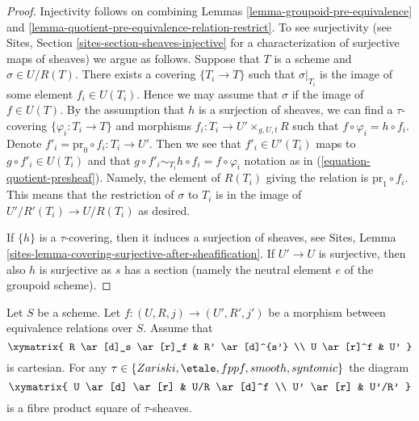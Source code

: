 \begin{proof}
Injectivity follows on combining
Lemmas \ref{lemma-groupoid-pre-equivalence} and
\ref{lemma-quotient-pre-equivalence-relation-restrict}.
To see surjectivity (see
Sites, Section \ref{sites-section-sheaves-injective}
for a characterization of surjective maps of sheaves) we argue as follows.
Suppose that $T$ is a scheme and $\sigma \in U/R(T)$.
There exists a covering $\{T_i \to T\}$ such that $\sigma|_{T_i}$
is the image of some element $f_i \in U(T_i)$. Hence we
may assume that $\sigma$ if the image of $f \in U(T)$.
By the assumption that $h$ is a surjection of sheaves, we
can find a $\tau$-covering $\{\varphi_i : T_i \to T\}$ and morphisms
$f_i : T_i \to U' \times_{g, U, t} R$ such that
$f \circ \varphi_i = h \circ f_i$. Denote
$f'_i = \text{pr}_0 \circ f_i : T_i \to U'$. Then we see that
$f'_i \in U'(T_i)$ maps to $g \circ f'_i \in U(T_i)$ and
that $g \circ f'_i \sim_{T_i} h \circ f_i = f \circ \varphi_i$
notation as in (\ref{equation-quotient-presheaf}). Namely, the
element of $R(T_i)$ giving the relation is $\text{pr}_1 \circ f_i$.
This means that the restriction
of $\sigma$ to $T_i$ is in the image of $U'/R'(T_i) \to U/R(T_i)$
as desired.

\medskip\noindent
If $\{h\}$ is a $\tau$-covering, then it induces a surjection of sheaves, see
Sites, Lemma \ref{sites-lemma-covering-surjective-after-sheafification}.
If $U' \to U$ is surjective, then also $h$ is surjective as $s$ has a section
(namely the neutral element $e$ of the groupoid scheme).
\end{proof}

\begin{lemma}
\label{lemma-criterion-fibre-product}
Let $S$ be a scheme. Let $f : (U, R, j) \to (U', R', j')$ be a morphism
between equivalence relations over $S$. Assume that
$$
\xymatrix{
R \ar[d]_s \ar[r]_f & R' \ar[d]^{s'} \\
U \ar[r]^f & U'
}
$$
is cartesian. For any
$\tau \in  \{Zariski, \etale, fppf, smooth, syntomic\}$
the diagram
$$
\xymatrix{
U \ar[d] \ar[r] & U/R \ar[d]^f \\
U' \ar[r] & U'/R'
}
$$
is a fibre product square of $\tau$-sheaves.
\end{lemma}

